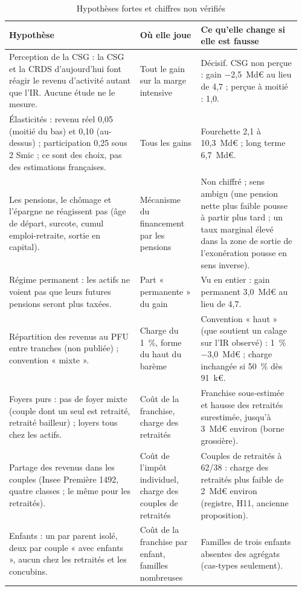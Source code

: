 \documentclass[11pt,a4paper]{article}
\begin{document}
\begin{table}[!htbp]\centering\scriptsize\setlength{\tabcolsep}{3pt}
\caption{Hypothèses fortes et chiffres non vérifiés}\label{tab:ircsg_hyp}
\begin{tabular}{@{}p{0.43\linewidth}p{0.2\linewidth}p{0.33\linewidth}@{}}
\toprule
Hypothèse & Où elle joue & Ce qu'elle change si elle est fausse \\
\midrule
Perception de la CSG : la CSG et la CRDS d'aujourd'hui font réagir le revenu d'activité autant que l'IR. Aucune étude ne le mesure. & Tout le gain sur la marge intensive & Décisif. CSG non perçue : gain $-$2,5~Md€ au lieu de 4,7 ; perçue à moitié : 1,0. \\[2pt]
Élasticités : revenu réel 0,05 (moitié du bas) et 0,10 (au-dessus) ; participation 0,25 sous 2 Smic ; ce sont des choix, pas des estimations françaises. & Tous les gains & Fourchette 2,1 à 10,3~Md€ ; long terme 6,7~Md€. \\[2pt]
Les pensions, le chômage et l'épargne ne réagissent pas (âge de départ, surcote, cumul emploi-retraite, sortie en capital). & Mécanisme du financement par les pensions & Non chiffré ; sens ambigu (une pension nette plus faible pousse à partir plus tard ; un taux marginal élevé dans la zone de sortie de l'exonération pousse en sens inverse). \\[2pt]
Régime permanent : les actifs ne voient pas que leurs futures pensions seront plus taxées. & Part « permanente » du gain & Vu en entier : gain permanent 3,0~Md€ au lieu de 4,7. \\[2pt]
Répartition des revenus au PFU entre tranches (non publiée) ; convention « mixte ». & Charge du 1~\%, forme du haut du barème & Convention « haut » (que soutient un calage sur l'IR observé) : 1~\% $-$3,0~Md€ ; charge inchangée si 50~\% dès 91~k€. \\[2pt]
Foyers purs : pas de foyer mixte (couple dont un seul est retraité, retraité bailleur) ; loyers tous chez les actifs. & Coût de la franchise, charge des retraités & Franchise sous-estimée et hausse des retraités surestimée, jusqu'à 3~Md€ environ (borne grossière). \\[2pt]
Partage des revenus dans les couples (Insee Première 1492, quatre classes ; le même pour les retraités). & Coût de l'impôt individuel, charge des couples de retraités & Couples de retraités à 62/38 : charge des retraités plus faible de 2~Md€ environ (registre, H11, ancienne proposition). \\[2pt]
Enfants : un par parent isolé, deux par couple « avec enfants », aucun chez les retraités et les concubins. & Coût de la franchise par enfant, familles nombreuses & Familles de trois enfants absentes des agrégats (cas-types seulement). \\[2pt]

\end{tabular}
\end{table}
\end{document}
